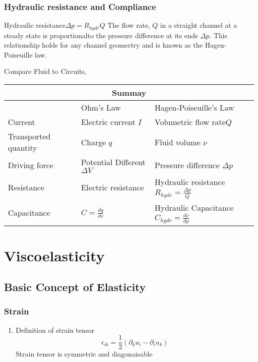 \documentclass[12pt,a4paper]{article}
\begin{document}
        \subsubsection{Hydraulic resistance and Compliance}
            \begin{definition}
                {Hydraulic resistance}{$\Delta p = R_{hydr}Q$}
                {
                    The flow rate, $Q$ in a straight channel at a steady state is proportionalto the pressure difference at its ends $\Delta p$. This relationship holds for any channel geomertry and is known as the Hagen-Poiseuille law.
                }
            \end{definition}
            Compare Fluid to Circuits,\\
            \begin{tabular}{ p{5cm}p{5cm}p{7cm}  }
                \hline
                \multicolumn{3}{c}{Summay} \\
                \hline
                                & Ohm's Law&Hagen-Poiseuille's Law\\
                Current & Electric current $I$  & Volumetric flow rate$Q$\\
                Transported quantity    & Charge $q$    & Fluid volume $\nu$\\
                Driving force & Potential Different $\Delta V$ & Pressure  difference $\Delta p$\\
                Resistance& Electric resistance     &Hydraulic resistance $R_{hydr}=\frac{\Delta p}{Q}$\\
                Capacitance & $C=\frac{dq}{dv}$ & Hydraulic Capacitance $C_{hydr}=\frac{d\nu}{dp}$\\
                \hline
               \end{tabular}
        

            
            
\section{Viscoelasticity}
\subsection{Basic Concept of Elasticity}
    \subsubsection{Strain}
        \begin{enumerate}
            \item Definition of strain tensor
            $$
                \epsilon_{ik}= \dfrac{1}{2}(\partial_{k}u_i-\partial_{i}u_k)
            $$
            Strain tensor is symmetric and diagonaisable
        \end{enumerate}
\end{document}
